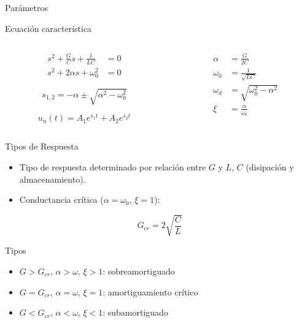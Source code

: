 \documentclass[xcolor={usenames,svgnames,dvipsnames}]{beamer}
\begin{document}
\begin{frame}[label={sec:org9a71830}]{Parámetros}
\begin{block}{Ecuación característica}
\begin{columns}
\begin{column}{.5\columnwidth}
\begin{align*}
s^2 + \frac{G}{C} s + \frac{1}{LC} &= 0\\
s^2 + 2\alpha s + \omega_0^2 &= 0  
\end{align*}

\[
  s_{1,2} = -\alpha \pm \sqrt{\alpha^2 - \omega_0^2}
\]

\[
  u_n(t) = A_1 e^{s_1 t} + A_2 e^{s_2 t}
\]
\end{column}
\begin{column}{.5\columnwidth}
\begin{align*}
  \alpha &= \frac{G}{2C}\\
  \omega_0 &= \frac{1}{\sqrt{LC}}\\
  \omega_d &= \sqrt{\omega_0^2 - \alpha^2}\\
  \xi &= \frac{\alpha}{\omega_0}
\end{align*}
\end{column}
\end{columns}
\end{block}
\end{frame}

\begin{frame}[label={sec:org2c6b37e}]{Tipos de Respuesta}
\begin{itemize}
\item Tipo de respuesta determinado por relación entre \(G\) y \(L\), \(C\) (disipación y almacenamiento).
\item Conductancia crítica (\(\alpha = \omega_0\), \(\xi = 1\)):
\end{itemize}

\[
  G_{cr} = 2\sqrt{\frac{C}{L}}
\]

\begin{block}{Tipos}
\begin{itemize}
\item \(G > G_{cr}\), \(\alpha > \omega\), \(\xi > 1\): \alert{sobreamortiguado}
\item \(G = G_{cr}\),  \(\alpha = \omega\), \(\xi = 1\): \alert{amortiguamiento crítico}
\item \(G < G_{cr}\),  \(\alpha < \omega\), \(\xi < 1\): \alert{subamortiguado}
\end{itemize}
\end{block}
\end{frame}
\end{document}
